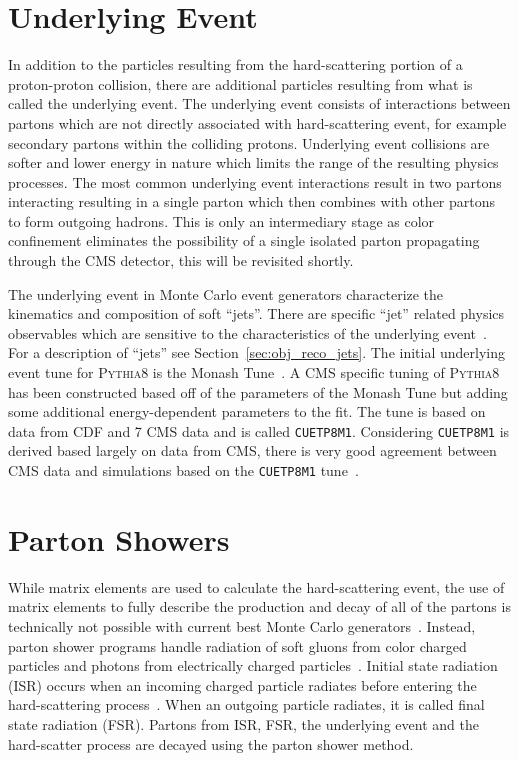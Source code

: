 \section{Underlying Event}
In addition to the particles resulting from the hard-scattering portion of a proton-proton collision,
there are additional particles resulting from what is called the underlying event. 
The underlying event consists of interactions between
partons which are not directly associated with hard-scattering event, for example secondary partons 
within the colliding protons.
Underlying event collisions are softer and lower energy in nature which limits the range of 
the resulting physics processes. 
The most common underlying event interactions result in two partons interacting resulting in a 
single parton which then combines with other partons to form outgoing hadrons. 
This is only an intermediary stage as color confinement eliminates the possibility
of a single isolated parton propagating through the CMS detector, this will be revisited shortly.

The underlying event in 
Monte Carlo event generators characterize the kinematics and composition of soft ``jets''.
There are specific ``jet'' related physics observables which are sensitive to the characteristics of the underlying
event~\cite{Khachatryan:2015pea, Field:cdf2008}. For a description of ``jets'' see Section~\ref{sec:obj_reco_jets}.
The initial underlying event tune for \textsc{Pythia8} is the Monash Tune~\cite{Skands:2014pea}. 
A CMS specific tuning of 
\textsc{Pythia8} has been constructed based off of the parameters of the Monash Tune but adding 
some additional energy-dependent parameters to the fit. The tune is based
on data from CDF and 7 \TeV CMS data and is called \texttt{CUETP8M1}.
Considering \texttt{CUETP8M1} is derived based largely on data from
CMS, there is very good agreement between CMS data and simulations based on the
\texttt{CUETP8M1} tune~\cite{Khachatryan:2015pea}. 



\section{Parton Showers}
While matrix elements are used to calculate the hard-scattering event, 
the use of matrix elements to fully describe the production and decay of all of the
partons is technically not possible with current best Monte Carlo generators~\cite{PhysRevD.94.074005}. 
Instead, parton shower programs handle radiation of soft gluons from 
color charged particles and photons from electrically charged particles~\cite{Sjostrand2005}.
Initial state radiation (ISR) occurs when an incoming charged particle radiates before entering the 
hard-scattering process~\cite{PDG}. When an outgoing particle radiates, it is called
final state radiation (FSR).
Partons from ISR, FSR, the underlying event and the hard-scatter 
process are decayed using the parton shower method. 

